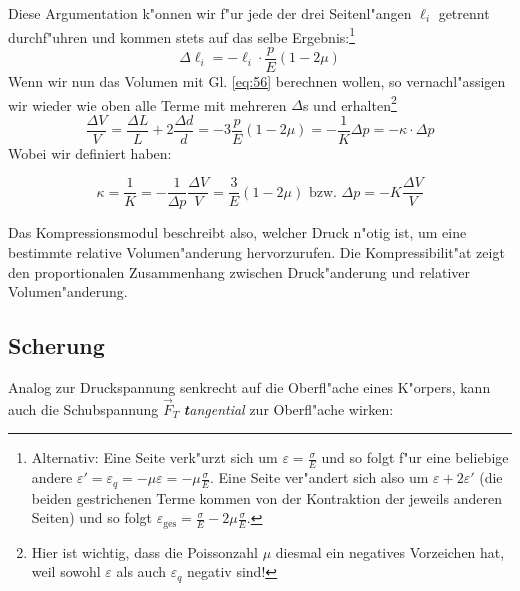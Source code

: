 Diese Argumentation k"onnen wir f"ur jede der drei Seitenl"angen $\ell_i$ getrennt
durchf"uhren und kommen stets auf das selbe
Ergebnis:\footnote{Alternativ: Eine Seite verk"urzt sich um
  $\varepsilon = \frac{\sigma}{E}$ und so folgt f"ur eine beliebige
  andere $\varepsilon' = \varepsilon_q = - \mu \varepsilon = - \mu
  \frac{\sigma}{E}$. Eine Seite ver"andert sich also um $\varepsilon +
  2 \varepsilon'$ (die beiden gestrichenen Terme kommen von der
  Kontraktion der jeweils anderen Seiten) und so folgt
  $\varepsilon_\text{ges} = \frac{\sigma}{E} - 2 \mu \frac{\sigma}{E}$.}
\begin{equation}
   \label{eq:58}
   \Delta \ell_i = - \ell_i \cdot \frac{p}{E} ( 1 - 2 \mu)
\end{equation}
Wenn wir nun das Volumen mit Gl. \eqref{eq:56} berechnen wollen, so
vernachl"assigen wir wieder wie oben alle Terme mit mehreren $\Delta$s
und erhalten\footnote{Hier ist wichtig, dass die Poissonzahl $\mu$
  diesmal ein negatives Vorzeichen hat, weil sowohl $\varepsilon$ als
  auch $\varepsilon_q$ negativ sind!}
\begin{equation}
   \label{eq:59}
   \frac{\Delta V}{V} = \frac{\Delta L}{L} + 2 \frac{\Delta d}{d} =
   -3\frac{p}{E} (1 - 2 \mu) = - \frac{1}{K} \Delta p = - \kappa \cdot
   \Delta p
\end{equation}
Wobei wir definiert haben:
\begin{Def}
   \begin{equation}
      \label{eqn_def_kompressionsmodul}
      \kappa = \frac{1}{K} = - \frac{1}{\Delta p} \frac{\Delta V}{V} =
      \frac{3}{E}(1 - 2\mu) 
\text{ bzw. } \boxed{\Delta p = - K\frac{\Delta V}{V}}
   \end{equation}
\end{Def}
Das Kompressionsmodul beschreibt also, welcher Druck n"otig ist, um
eine bestimmte relative Volumen"anderung hervorzurufen. Die
Kompressibilit"at zeigt den proportionalen Zusammenhang zwischen
Druck"anderung und relativer Volumen"anderung.




\subsection{Scherung}
\label{kap_scherung}

Analog zur Druckspannung senkrecht auf die Oberfl"ache eines K"orpers,
kann auch die Schubspannung $\vec F_T$  \emph{\textbf tangential} zur
Oberfl"ache wirken:

